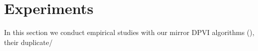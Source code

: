 
\section{Experiments}

In this section we conduct empirical studies with our mirror DPVI algorithms (),
their duplicate/ 